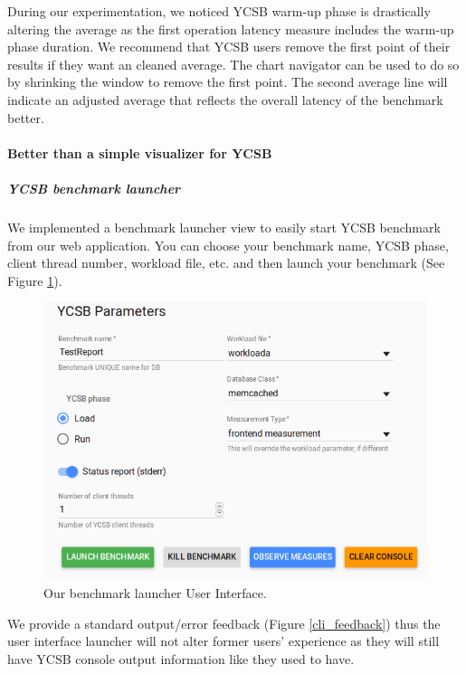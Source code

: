 \documentclass[a4paper,11pt]{report}
\begin{document}
During our experimentation, we noticed YCSB warm-up phase is drastically altering the average as the first operation latency measure includes the warm-up phase duration. We recommend that YCSB users remove the first point of their results if they want an cleaned average. The chart navigator can be used to do so by shrinking the window to remove the first point. The second average line will indicate an adjusted average that reflects the overall latency of the benchmark better.

\paragraph{Better than a simple visualizer for YCSB}

\subparagraph{YCSB benchmark launcher}

We implemented a benchmark launcher view to easily start YCSB benchmark from our web application. You can choose your benchmark name, YCSB phase, client thread number, workload file, etc. and then launch your benchmark (See Figure \ref{launcher_ui}).

\begin{figure}[ht]
\begin{center}
\includegraphics[width=1\linewidth]{images/launcher_ui.png}
\caption{Our benchmark launcher User Interface.}
\label{launcher_ui}
\end{center}
\end{figure}

We provide a standard output/error feedback (Figure \ref{cli_feedback}) thus the user interface launcher will not alter former users' experience as they will still have YCSB console output information like they used to have.
\end{document}
